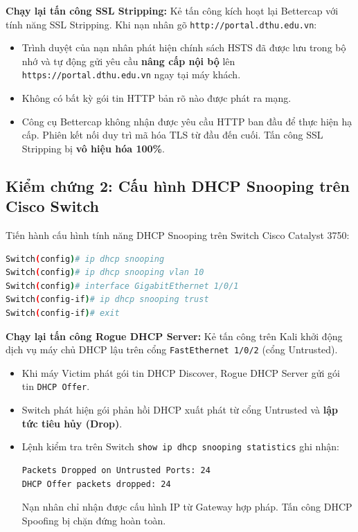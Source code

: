\textbf{Chạy lại tấn công SSL Stripping:} Kẻ tấn công kích hoạt lại Bettercap với tính năng SSL Stripping. Khi nạn nhân gõ \texttt{http://portal.dthu.edu.vn}:
\begin{itemize}
  \item Trình duyệt của nạn nhân phát hiện chính sách HSTS đã được lưu trong bộ nhớ và tự động gửi yêu cầu \textbf{nâng cấp nội bộ} lên \texttt{https://portal.dthu.edu.vn} ngay tại máy khách.
  \item Không có bất kỳ gói tin HTTP bản rõ nào được phát ra mạng.
  \item Công cụ Bettercap không nhận được yêu cầu HTTP ban đầu để thực hiện hạ cấp. Phiên kết nối duy trì mã hóa TLS từ đầu đến cuối. Tấn công SSL Stripping bị \textbf{vô hiệu hóa 100\%}.
\end{itemize}

\subsection{Kiểm chứng 2: Cấu hình DHCP Snooping trên Cisco Switch}

Tiến hành cấu hình tính năng DHCP Snooping trên Switch Cisco Catalyst 3750:
\begin{lstlisting}[language=bash]
Switch(config)# ip dhcp snooping
Switch(config)# ip dhcp snooping vlan 10
Switch(config)# interface GigabitEthernet 1/0/1
Switch(config-if)# ip dhcp snooping trust
Switch(config-if)# exit
\end{lstlisting}

\textbf{Chạy lại tấn công Rogue DHCP Server:} Kẻ tấn công trên Kali khởi động dịch vụ máy chủ DHCP lậu trên cổng \texttt{FastEthernet 1/0/2} (cổng Untrusted).
\begin{itemize}
  \item Khi máy Victim phát gói tin DHCP Discover, Rogue DHCP Server gửi gói tin \texttt{DHCP Offer}.
  \item Switch phát hiện gói phản hồi DHCP xuất phát từ cổng Untrusted và \textbf{lập tức tiêu hủy (Drop)}.
  \item Lệnh kiểm tra trên Switch \texttt{show ip dhcp snooping statistics} ghi nhận:
  \begin{lstlisting}[language=bash]
Packets Dropped on Untrusted Ports: 24
DHCP Offer packets dropped: 24
  \end{lstlisting}
  Nạn nhân chỉ nhận được cấu hình IP từ Gateway hợp pháp. Tấn công DHCP Spoofing bị chặn đứng hoàn toàn.
\end{itemize}

